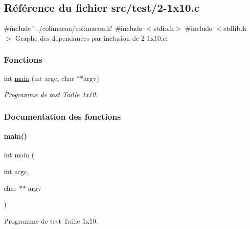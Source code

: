 \hypertarget{2-1x10_8c}{}\subsection{Référence du fichier src/test/2-\/1x10.c}
\label{2-1x10_8c}
{\ttfamily \#include \char`\"{}../colimacon/colimacon.\+h\char`\"{}}\newline
{\ttfamily \#include $<$stdio.\+h$>$}\newline
{\ttfamily \#include $<$stdlib.\+h$>$}\newline
Graphe des dépendances par inclusion de 2-\/1x10.c\+:
\subsubsection*{Fonctions}
\begin{DoxyCompactItemize}
\item 
int \hyperlink{2-1x10_8c_a3c04138a5bfe5d72780bb7e82a18e627}{main} (int argc, char $\ast$$\ast$argv)
\begin{DoxyCompactList}\small\item\em Programme de test Taille 1x10. \end{DoxyCompactList}\end{DoxyCompactItemize}


\subsubsection{Documentation des fonctions}
\mbox{\label{2-1x10_8c_a3c04138a5bfe5d72780bb7e82a18e627}} 
\paragraph{\texorpdfstring{main()}{main()}}
{\footnotesize\ttfamily int main (\begin{DoxyParamCaption}\item[{int}]{argc,  }\item[{char $\ast$$\ast$}]{argv }\end{DoxyParamCaption})}



Programme de test Taille 1x10. 

